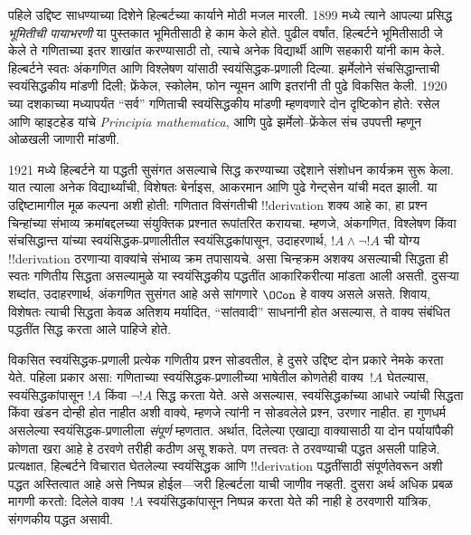 \documentclass[../../../include/open-logic-section]{subfiles}
\begin{document}
पहिले उद्दिष्ट साधण्याच्या दिशेने हिल्बर्टच्या कार्याने मोठी मजल मारली.
1899 मध्ये त्याने आपल्या प्रसिद्ध \emph{भूमितीची पायाभरणी} या पुस्तकात
भूमितीसाठी हे काम केले होते. पुढील वर्षांत, हिल्बर्टने भूमितीसाठी जे
केले ते गणिताच्या इतर शाखांत करण्यासाठी तो, त्याचे अनेक विद्यार्थी आणि
सहकारी यांनी काम केले. हिल्बर्टने स्वतः अंकगणित आणि विश्लेषण यांसाठी
स्वयंसिद्धक-प्रणाली दिल्या. झर्मेलोने संचसिद्धान्ताची स्वयंसिद्धकीय मांडणी
दिली; फ्रेंकेल, स्कोलेम, फोन न्यूमन आणि इतरांनी ती पुढे विकसित केली.
1920 च्या दशकाच्या मध्यापर्यंत ``सर्व'' गणिताची स्वयंसिद्धकीय मांडणी
म्हणवणारे दोन दृष्टिकोन होते: रसेल आणि व्हाइटहेड यांचे \emph{Principia
  mathematica}, आणि पुढे झर्मेलो--फ्रेंकेल संच उपपत्ती म्हणून ओळखली
जाणारी मांडणी.

1921 मध्ये हिल्बर्टने या पद्धती सुसंगत असल्याचे सिद्ध करण्याच्या उद्देशाने
संशोधन कार्यक्रम सुरू केला. यात त्याला अनेक विद्यार्थ्यांची, विशेषतः
बेर्नाइस, आकरमान आणि पुढे गेन्ट्सेन यांची मदत झाली. या उद्दिष्टामागील
मूळ कल्पना अशी होती: गणितात विसंगतीची !!{derivation} शक्य आहे का, हा
प्रश्न चिन्हांच्या संभाव्य क्रमांबद्दलच्या संयुक्तिक प्रश्नात रूपांतरित
करायचा. म्हणजे, अंकगणित, विश्लेषण किंवा संचसिद्धान्त यांच्या
स्वयंसिद्धक-प्रणालीतील स्वयंसिद्धकांपासून, उदाहरणार्थ, $!A \land
\lnot !A$ ची योग्य !!{derivation} ठरणाऱ्या वाक्यांचे संभाव्य क्रम
तपासायचे. असा चिन्हक्रम अशक्य असल्याची सिद्धता ही स्वतः गणितीय सिद्धता
असल्यामुळे या स्वयंसिद्धकीय पद्धतींत आकारिकरीत्या मांडता आली असती.
दुसऱ्या शब्दांत, उदाहरणार्थ, अंकगणित सुसंगत आहे असे सांगणारे
$\OCon$ हे वाक्य असले असते. शिवाय, विशेषतः त्याची सिद्धता केवळ अतिशय
मर्यादित, ``सांतवादी'' साधनांनी होत असल्यास, ते वाक्य संबंधित पद्धतींत
सिद्ध करता आले पाहिजे होते.

विकसित स्वयंसिद्धक-प्रणाली प्रत्येक गणितीय प्रश्न सोडवतील, हे दुसरे
उद्दिष्ट दोन प्रकारे नेमके करता येते. पहिला प्रकार असा: गणिताच्या
स्वयंसिद्धक-प्रणालीच्या भाषेतील कोणतेही वाक्य~$!A$ घेतल्यास,
स्वयंसिद्धकांपासून $!A$ किंवा $\lnot !A$ सिद्ध करता येते. असे असल्यास,
स्वयंसिद्धकांच्या आधारे ज्यांची सिद्धता किंवा खंडन दोन्ही होत नाहीत अशी
वाक्ये, म्हणजे त्यांनी न सोडवलेले प्रश्न, उरणार नाहीत. हा गुणधर्म
असलेल्या स्वयंसिद्धक-प्रणालीला \emph{संपूर्ण} म्हणतात. अर्थात, दिलेल्या
एखाद्या वाक्यासाठी या दोन पर्यायांपैकी कोणता खरा आहे हे ठरवणे तरीही
कठीण असू शकते. पण तत्त्वतः ते ठरवण्याची पद्धत असली पाहिजे. प्रत्यक्षात,
हिल्बर्टने विचारात घेतलेल्या स्वयंसिद्धक आणि !!{derivation} पद्धतींसाठी
संपूर्णतेवरून अशी पद्धत अस्तित्वात आहे असे निष्पन्न होईल---जरी हिल्बर्टला
याची जाणीव नव्हती. दुसरा अर्थ अधिक प्रबळ मागणी करतो: दिलेले
वाक्य~$!A$ स्वयंसिद्धकांपासून निष्पन्न करता येते की नाही हे ठरवणारी
यांत्रिक, संगणकीय पद्धत असावी.
\end{document}
